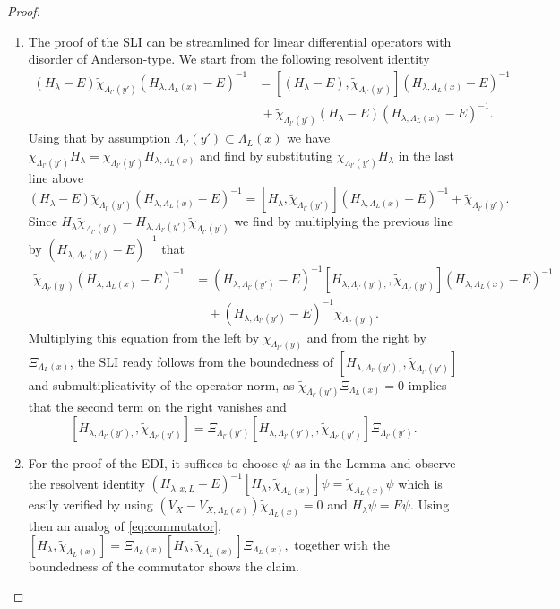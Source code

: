 \documentclass[reqno,12pt,letterpaper]{amsart}
\numberwithin{equation}{section}
\begin{document}
\begin{proof}
\begin{enumerate}
\item The proof of the SLI can be streamlined for linear differential operators with disorder of Anderson-type. We start from the following resolvent identity
\[ \begin{split}
(H_{\lambda}-E)\tilde \chi_{\Lambda_{l'}(y')}(H_{\lambda,\Lambda_L(x)}-E)^{-1} &= [ (H_{\lambda}-E),\tilde \chi_{\Lambda_{l'}(y')}](H_{\lambda,\Lambda_L(x)}-E)^{-1} \\
&\ + \tilde\chi_{\Lambda_{l'}(y')} (H_{\lambda}-E) (H_{\lambda,\Lambda_L(x)}-E)^{-1}.
\end{split}\]
Using that by assumption $\Lambda_{l'}(y') \subset \Lambda_{L}(x)$ we have $\chi_{\Lambda_{l'}(y')}H_{\lambda} = \chi_{\Lambda_{l'}(y')}H_{\lambda,\Lambda_L(x)}$ and find by substituting $\chi_{\Lambda_{l'}(y')}H_{\lambda} $ in the last line above 
\[ (H_{\lambda}-E)\tilde \chi_{\Lambda_{l'}(y')}(H_{\lambda,\Lambda_L(x)}-E)^{-1} = [ H_{\lambda},\tilde \chi_{\Lambda_{l'}(y')}](H_{\lambda,\Lambda_L(x)}-E)^{-1} + \tilde \chi_{\Lambda_{l'}(y')}.\]
Since $H_{\lambda}  \tilde\chi_{\Lambda_{l'}(y')} = H_{\lambda,\Lambda_{l'}(y')} \tilde\chi_{\Lambda_{l'}(y')}$ we find by multiplying the previous line by $(H_{\lambda,\Lambda_{l'}(y')}-E)^{-1}$ that 
\[ \begin{split} \tilde \chi_{\Lambda_{l'}(y')}(H_{\lambda,\Lambda_L(x)}-E)^{-1} &= (H_{\lambda,\Lambda_{l'}(y')}-E)^{-1}[ H_{\lambda,\Lambda_{l'}(y'),},\tilde \chi_{\Lambda_{l'}(y')}](H_{\lambda,\Lambda_L(x)}-E)^{-1} \\
&\quad + (H_{\lambda,\Lambda_{l'}(y')}-E)^{-1}\tilde\chi_{\Lambda_{l'}(y')}.
\end{split}\] 
Multiplying this equation from the left by $\chi_{\Lambda_{l''}(y)}$ and from the right by $\Xi_{\Lambda_L(x)}$, the SLI ready follows from the boundedness of $[ H_{\lambda,\Lambda_{l'}(y'),},\tilde \chi_{\Lambda_{l'}(y')}]$ and submultiplicativity of the operator norm, as $\tilde \chi_{\Lambda_{l'}(y')} \Xi_{\Lambda_L(x)}=0$ implies that the second term on the right vanishes and 
\begin{equation}
\label{eq:commutator}
[ H_{\lambda,\Lambda_{l'}(y'),},\tilde \chi_{\Lambda_{l'}(y')}] = \Xi_{\Lambda_{l'}(y')}[ H_{\lambda,\Lambda_{l'}(y'),},\tilde \chi_{\Lambda_{l'}(y')}] \Xi_{\Lambda_{l'}(y')}.
\end{equation}

\item For the proof of the EDI, it suffices to choose $\psi$ as in the Lemma and observe the resolvent identity $(H_{\lambda, x, L}-E)^{-1}[H_{\lambda}, \tilde \chi_{\Lambda_L(x)} ]\psi=\tilde \chi_{\Lambda_L(x)} \psi$ which is easily verified by using $(V_X-V_{X,\Lambda_L(x)}) \tilde \chi_{\Lambda_L(x)}=0$ and $H_{\lambda} \psi = E \psi.$
Using then an analog of \eqref{eq:commutator}, $[H_{\lambda}, \tilde \chi_{\Lambda_L(x)} ]= \Xi_{\Lambda_L(x)}[H_{\lambda}, \tilde \chi_{\Lambda_L(x)} ]\Xi_{\Lambda_L(x)},$ together with the boundedness of the commutator shows the claim.
\end{enumerate}
\end{proof}
\end{document}
